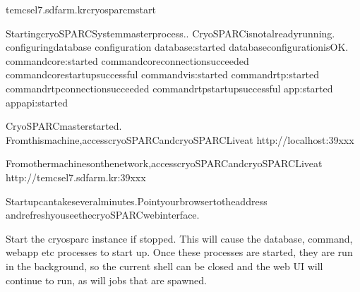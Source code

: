 \documentclass[a4paper,10pt,english]{sphinxmanual}
\begin{document}
\begin{sphinxVerbatim}[commandchars=\\\{\}]
tem\PYGZhy{}cs\PYGZhy{}el7.sdfarm.kr\PYGZdl{}\PYGZgt{}cryosparcmstart

StartingcryoSPARCSystemmasterprocess..
CryoSPARCisnotalreadyrunning.
configuringdatabase
configuration
database:started
databaseconfigurationisOK.
command\PYGZus{}core:started
command\PYGZus{}coreconnectionsucceeded
command\PYGZus{}corestartupsuccessful
command\PYGZus{}vis:started
command\PYGZus{}rtp:started
command\PYGZus{}rtpconnectionsucceeded
command\PYGZus{}rtpstartupsuccessful
app:started
app\PYGZus{}api:started
\PYGZhy{}\PYGZhy{}\PYGZhy{}\PYGZhy{}\PYGZhy{}\PYGZhy{}\PYGZhy{}\PYGZhy{}\PYGZhy{}\PYGZhy{}\PYGZhy{}\PYGZhy{}\PYGZhy{}\PYGZhy{}\PYGZhy{}\PYGZhy{}\PYGZhy{}\PYGZhy{}\PYGZhy{}\PYGZhy{}\PYGZhy{}\PYGZhy{}\PYGZhy{}\PYGZhy{}\PYGZhy{}\PYGZhy{}\PYGZhy{}\PYGZhy{}\PYGZhy{}\PYGZhy{}\PYGZhy{}\PYGZhy{}\PYGZhy{}\PYGZhy{}\PYGZhy{}\PYGZhy{}\PYGZhy{}\PYGZhy{}\PYGZhy{}\PYGZhy{}\PYGZhy{}\PYGZhy{}\PYGZhy{}\PYGZhy{}\PYGZhy{}\PYGZhy{}\PYGZhy{}\PYGZhy{}\PYGZhy{}\PYGZhy{}\PYGZhy{}\PYGZhy{}\PYGZhy{}

CryoSPARCmasterstarted.
Fromthismachine,accesscryoSPARCandcryoSPARCLiveat
http://localhost:39xxx

Fromothermachinesonthenetwork,accesscryoSPARCandcryoSPARCLiveat
http://tem\PYGZhy{}cs\PYGZhy{}el7.sdfarm.kr:39xxx


Startupcantakeseveralminutes.Pointyourbrowsertotheaddress
andrefreshyouseethecryoSPARCwebinterface.
\end{sphinxVerbatim}

\sphinxAtStartPar
Start the cryosparc instance if stopped. This will cause the database, command, webapp etc processes to start up.
Once these processes are started, they are run in the background, so the current shell can be closed and the web UI will continue to run, as will jobs that are spawned.
\end{document}
